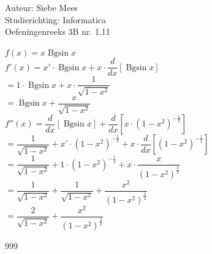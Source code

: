 \documentclass[a4paper]{article}
\newcommand{\Bgsin}{\operatorname{Bgsin}}
\begin{document}
  
\noindent \large Auteur: Siebe Mees \\
\noindent \large Studierichting: Informatica \\
\noindent \large Oefeningenreeks 3B nr. 1.11 \\

\medskip

\normalsize

$ f(x) = x \Bgsin x $ \\

$ f'(x) = x' \cdot \Bgsin x + x \cdot \dfrac{d}{dx} \left[ \Bgsin x \right] $ \\

$ = 1 \cdot \Bgsin x + x \cdot \dfrac{1}{\sqrt{1-x^2}} $ \\

$ = \Bgsin x + \dfrac{x}{\sqrt{1-x^2}}$ \\

$ f''(x) = \dfrac{d}{dx} \left[ \Bgsin x  \right] + \dfrac{d}{dx} \left[ x \cdot (1-x^2) ^{-\tfrac{1}{2}} \right]$ \\

$ = \dfrac{1}{\sqrt{1-x^2}} + x' \cdot (1-x^2)^{-\tfrac{1}{2}} + x \cdot \dfrac{d}{dx} \left[(1-x^2)^{-\tfrac{1}{2}} \right] $\\

$ = \dfrac{1}{\sqrt{1-x^2}} + 1 \cdot (1-x^2)^{-\tfrac{1}{2}} + x \cdot \dfrac{x}{(1-x^2)^{\tfrac{3}{2}}} $\\

$ = \dfrac{1}{\sqrt{1-x^2}} + \dfrac{1}{\sqrt{1-x^2}} + \dfrac{x^2}{(1-x^2)^{\tfrac{3}{2}}} $\\

$ = \dfrac{2}{\sqrt{1-x^2}} + \dfrac{x^2}{(1-x^2)^{\tfrac{3}{2}}} $\\

\begin{thebibliography}{999}
\end{thebibliography}
\end{document}
